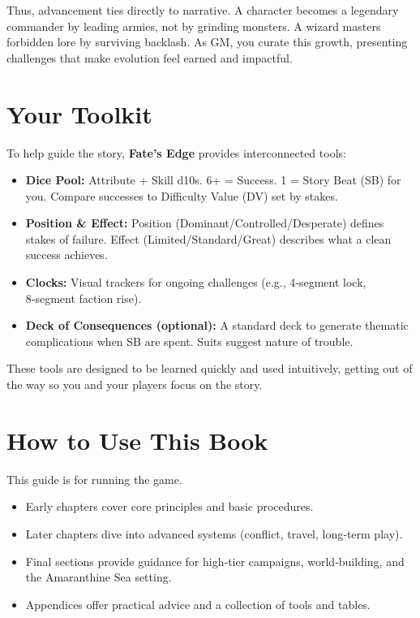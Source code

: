 Thus, advancement ties directly to narrative. A character becomes a legendary commander by leading armies, not by grinding monsters. A wizard masters forbidden lore by surviving backlash. As GM, you curate this growth, presenting challenges that make evolution feel earned and impactful.

\section{Your Toolkit}
\label{sec:gm-toolkit}

To help guide the story, \textbf{Fate's Edge} provides interconnected tools:

\begin{itemize}
    \item \textbf{Dice Pool:} Attribute + Skill d10s. 6+ = Success. 1 = Story Beat (SB) for you. Compare successes to Difficulty Value (DV) set by stakes.
    \item \textbf{Position \& Effect:} Position (Dominant/Controlled/Desperate) defines stakes of failure. Effect (Limited/Standard/Great) describes what a clean success achieves.
    \item \textbf{Clocks:} Visual trackers for ongoing challenges (e.g., 4‑segment lock, 8‑segment faction rise).
    \item \textbf{Deck of Consequences (optional):} A standard deck to generate thematic complications when SB are spent. Suits suggest nature of trouble.
\end{itemize}

These tools are designed to be learned quickly and used intuitively, getting out of the way so you and your players focus on the story.

\section{How to Use This Book}
\label{sec:gm-how-to-use}

This guide is for running the game.

\begin{itemize}
    \item Early chapters cover core principles and basic procedures.
    \item Later chapters dive into advanced systems (conflict, travel, long‑term play).
    \item Final sections provide guidance for high‑tier campaigns, world‑building, and the Amaranthine Sea setting.
    \item Appendices offer practical advice and a collection of tools and tables.
\end{itemize}

